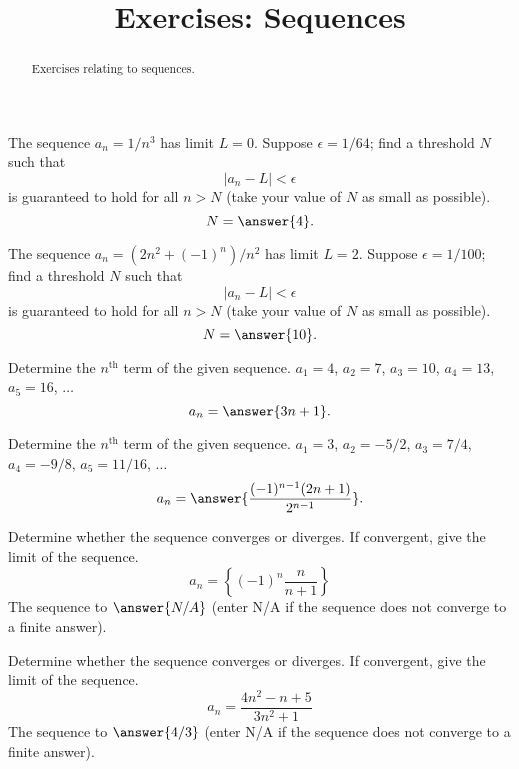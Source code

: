 \documentclass{ximera}
\title{Exercises: Sequences}
\begin{document}
\begin{abstract}
Exercises relating to sequences.
\end{abstract}
\maketitle

\begin{exercise}
The sequence $a_n = 1/n^3$ has limit $L = 0$. Suppose $\epsilon = 1/64$; find a threshold $N$ such that
\[ |a_n -L| < \epsilon \]
is guaranteed to hold for all $n > N$ (take your value of $N$ as small as possible).
\[ N = \answer{4}. \]
\end{exercise}

\begin{exercise}
The sequence $a_n = (2n^2 + (-1)^n)/n^2$ has limit $L = 2$. Suppose $\epsilon = 1/100$; find a threshold $N$ such that
\[ |a_n -L| < \epsilon \]
is guaranteed to hold for all $n > N$ (take your value of $N$ as small as possible).
\[ N = \answer{10}. \]
\end{exercise}

\begin{exercise}%
Determine the \(n^\text{th}\) term of the given sequence. $a_1 = 4$, $a_2 = 7$, $a_3 = 10$, $a_4 = 13$, $a_5 = 16$, \(\ldots\)
\[ a_n = \answer{3n+1}. \]
\end{exercise}
\begin{exercise}%
Determine the \(n^\text{th}\) term of the given sequence. $a_1 = 3$, $a_2 = -5/2$, $a_3 = 7/4$, $a_4 = -9/8$, $a_5 = 11/16$, \(\ldots\)
\[ a_n = \answer{\frac{(-1)^{n-1} (2n+1)}{2^{n-1}}}. \]
\end{exercise}

\begin{exercise}%
Determine whether the sequence converges or diverges. If convergent, give the limit of the sequence. 
\[ a_n = \left\{(-1)^n\frac{n}{n+1}\right\} \]
The sequence  to $\answer{N/A}$ (enter N/A if the sequence does not converge to a finite answer).
\end{exercise}

\begin{exercise}%
Determine whether the sequence converges or diverges. If convergent, give the limit of the sequence. 
\[ a_n = \frac{4n^2-n+5}{3n^2+1} \]
The sequence  to $\answer{4/3}$ (enter N/A if the sequence does not converge to a finite answer).
\end{exercise}
\end{document}
